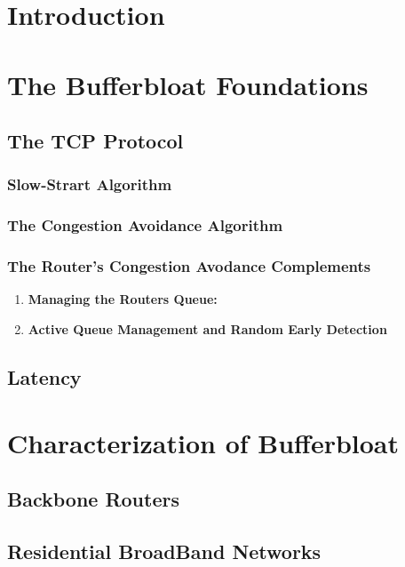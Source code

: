 \documentclass[letter, 11pt]{article}
\begin{document}




\newpage

\section{Introduction}



\section{The Bufferbloat Foundations}
\subsection{The TCP Protocol \cite{rfc793}\cite{rfc2001}}



\subsubsection{Slow-Strart Algorithm\cite{rfc879}\cite{rfc2460}}



\subsubsection{The Congestion Avoidance Algorithm \cite{rfc2309}\cite{rfc2581}}

\subsubsection{The Router's Congestion Avodance Complements}

\begin{enumerate}
\item \textbf{Managing the Routers Queue:} 
\item \textbf{Active Queue Management and Random Early Detection} 
\end{enumerate}

\subsection{Latency}



\section{Characterization of Bufferbloat}

\subsection{Backbone Routers}



\subsection{Residential BroadBand Networks}



{}
\end{document}

